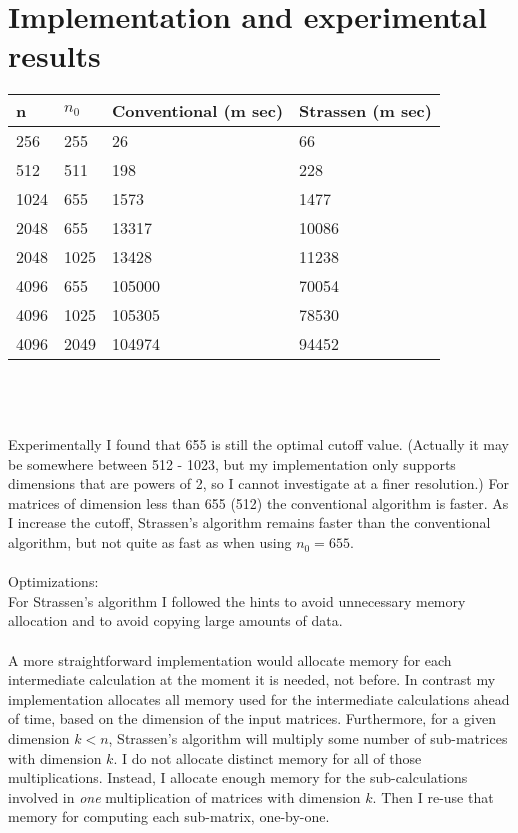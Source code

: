 \documentclass[11pt]{article}
\begin{document}
\section{Implementation and experimental results}
\begin{tabular}{l|l|l|l}
n & $n_0$ & Conventional (m sec) & Strassen (m sec) \\  \hline
256 & 255 & 26 & 66 \\
512 & 511 & 198 & 228 \\
1024 & 655 & 1573 & 1477 \\
2048 & 655 & 13317 & 10086 \\
2048 & 1025 & 13428 & 11238 \\
4096 & 655 & 105000 & 70054 \\
4096 & 1025 & 105305 & 78530 \\
4096 & 2049 & 104974 & 94452
\end{tabular}
\\
\\
\\
Experimentally I found that 655 is still the optimal cutoff value. (Actually it may be somewhere between 512 - 1023, but my implementation only supports dimensions that are powers of 2, so I cannot investigate at a finer resolution.) For matrices of dimension less than 655 (512) the conventional algorithm is faster. As I increase the cutoff, Strassen's algorithm remains faster than the conventional algorithm, but not quite as fast as when using $n_0 = 655$. \\
\\
Optimizations:  \\
For Strassen's algorithm I followed the hints to avoid unnecessary memory allocation and to avoid copying large amounts of data. \\
\\
A more straightforward implementation would allocate memory for each intermediate calculation at the moment it is needed, not before.  In contrast my implementation allocates all memory used for the intermediate calculations ahead of time, based on the dimension of the input matrices. Furthermore, for a given dimension $k < n$, Strassen's algorithm will multiply some number of sub-matrices with dimension $k$. I do not allocate distinct memory for all of those multiplications. Instead, I allocate enough memory for the sub-calculations involved in \emph{one} multiplication of matrices with dimension $k$. Then I re-use that memory for computing each sub-matrix, one-by-one.
\\
\end{document}
